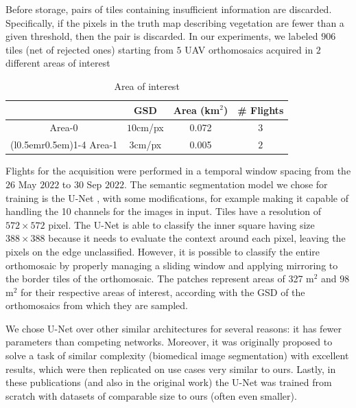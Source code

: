 \documentclass[comsoc,final]{IEEEtran}
\newcommand{\todo}[1]{\textcolor{red}{#1}}
\begin{document}
Before storage, pairs of tiles containing insufficient information are discarded. Specifically, if the pixels in the truth map describing vegetation are fewer than a given threshold, then the pair is discarded. In our experiments, we labeled $906$ tiles (net of rejected ones) starting from $5$ UAV orthomosaics acquired in $2$ different areas of interest 
\begin{table}[htbp]
  \centering
  \caption{Area of interest}
  \label{tab:aoi}
  \begin{tabular}{c*{3}{c}}
\toprule
           & GSD     & Area (km$^2$)             & \# Flights  \\
    \midrule
    Area-0  & $10$cm/px& 0.072 & $3$  \\
    \cmidrule(l{0.5em}r{0.5em}){1-4}
    Area-1 & $3$cm/px & 0.005 & $ 2 $  \\
    \bottomrule
  \end{tabular}
\end{table}
Flights for the acquisition were performed in a temporal window spacing from the $26$ May $2022$ to $30$ Sep $2022$. The semantic segmentation model we chose for training is the U-Net 
\cite{ronneberger_u-net_2015}, with some modifications, 
for example making it capable of handling the 10 channels for the images in input. 
Tiles have a resolution of $572\times572$ pixel. The U-Net is able to classify the inner square having size $388\times388$ because it needs to evaluate the context around each pixel, leaving the pixels on the edge unclassified. However, it is possible to classify the entire orthomosaic by properly managing a sliding window and applying mirroring to the border tiles of the orthomosaic. The patches represent areas of 327 m$^2$  and $98$ m$^2$ for their respective areas of interest, according with the GSD of the orthomosaics from which they are sampled.




We chose U-Net over other similar architectures for several reasons: it has fewer parameters than competing networks. Moreover, it was originally proposed to solve a task of similar complexity (biomedical image segmentation) with excellent results, which were then replicated on use cases very similar to ours. Lastly, in these publications (and also in the original work) the U-Net was trained from scratch with datasets of comparable size to ours (often even smaller).
\end{document}
